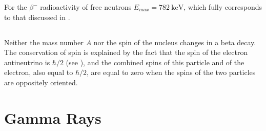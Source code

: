 For the $\beta^{-}$ radioactivity of free neutrons $E_{max} = \SI{782}{\kilo\electronvolt}$, which fully corresponds to that discussed in .

\subsection{}\label{42.6.7} Neither the mass number $A$ nor the spin of the nucleus  changes in a beta decay. The conservation of spin is explained by the fact that the spin of the electron antineutrino is $\hbar/2$ (see  ), and the combined spins of this particle
and of the electron, also equal to $\hbar/2$, are equal to zero when the spins of the two particles are oppositely oriented.

\section{Gamma Rays}
\label{sec-42.7} 


 
